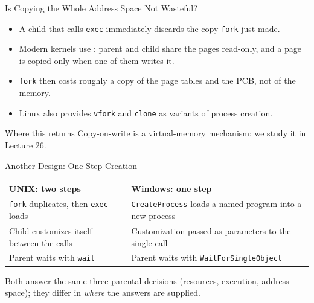 \documentclass[aspectratio=169]{beamer}
\begin{document}
\begin{frame}{Is Copying the Whole Address Space Not Wasteful?}
  \begin{itemize}
    \item A child that calls \texttt{exec} immediately discards the copy
      \texttt{fork} just made.
    \item Modern kernels use : parent and child share the
      pages read-only, and a page is copied only when one of them writes it.
    \item \texttt{fork} then costs roughly a copy of the page tables and the
      PCB, not of the memory.
    \item Linux also provides \texttt{vfork} and \texttt{clone} as variants
      of process creation.
  \end{itemize}
  \vspace{0.2cm}
  \begin{block}{Where this returns}
    Copy-on-write is a virtual-memory mechanism; we study it in Lecture 26.
  \end{block}
\end{frame}

\begin{frame}{Another Design: One-Step Creation}
  \centering
  \renewcommand{\arraystretch}{1.35}
  \begin{tabular}{p{}p{}}
    \textbf{UNIX: two steps} & \textbf{Windows: one step} \\
    \hline
    \texttt{fork} duplicates, then \texttt{exec} loads &
    \texttt{CreateProcess} loads a named program into a new process \\
    Child customizes itself between the calls &
    Customization passed as parameters to the single call \\
    Parent waits with \texttt{wait} &
    Parent waits with \texttt{WaitForSingleObject} \\
  \end{tabular}
  \vspace{0.35cm}

  \raggedright
  \small Both answer the same three parental decisions (resources,
  execution, address space); they differ in \emph{where} the answers are
  supplied. 
\end{frame}

\end{document}
